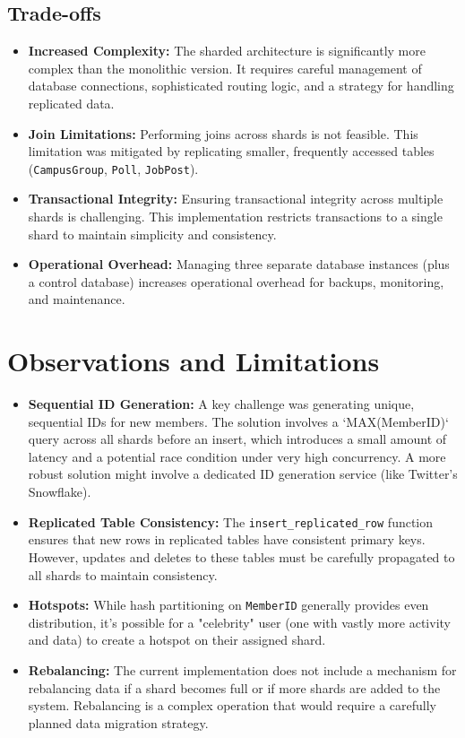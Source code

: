 \documentclass{article}
\begin{document}
\subsection{Trade-offs}
\begin{itemize}
    \item \textbf{Increased Complexity:} The sharded architecture is significantly more complex than the monolithic version. It requires careful management of database connections, sophisticated routing logic, and a strategy for handling replicated data.
    \item \textbf{Join Limitations:} Performing joins across shards is not feasible. This limitation was mitigated by replicating smaller, frequently accessed tables (\texttt{CampusGroup}, \texttt{Poll}, \texttt{JobPost}).
    \item \textbf{Transactional Integrity:} Ensuring transactional integrity across multiple shards is challenging. This implementation restricts transactions to a single shard to maintain simplicity and consistency.
    \item \textbf{Operational Overhead:} Managing three separate database instances (plus a control database) increases operational overhead for backups, monitoring, and maintenance.
\end{itemize}

\section{Observations and Limitations}
\begin{itemize}
    \item \textbf{Sequential ID Generation:} A key challenge was generating unique, sequential IDs for new members. The solution involves a `MAX(MemberID)` query across all shards before an insert, which introduces a small amount of latency and a potential race condition under very high concurrency. A more robust solution might involve a dedicated ID generation service (like Twitter's Snowflake).
    \item \textbf{Replicated Table Consistency:} The \texttt{insert\_replicated\_row} function ensures that new rows in replicated tables have consistent primary keys. However, updates and deletes to these tables must be carefully propagated to all shards to maintain consistency.
    \item \textbf{Hotspots:} While hash partitioning on \texttt{MemberID} generally provides even distribution, it's possible for a "celebrity" user (one with vastly more activity and data) to create a hotspot on their assigned shard.
    \item \textbf{Rebalancing:} The current implementation does not include a mechanism for rebalancing data if a shard becomes full or if more shards are added to the system. Rebalancing is a complex operation that would require a carefully planned data migration strategy.
\end{itemize}
\end{document}
